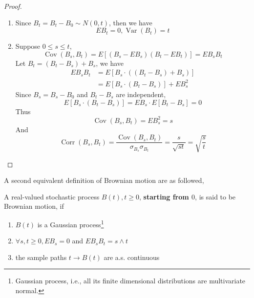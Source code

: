 \begin{proof}
    \begin{enumerate}
        \item Since $B_{t}=B_{t}-B_{0}\sim N(0, t)$, then we have
              \begin{equation*}
                  EB_{t}=0,\operatorname{Var}\left(B_{t}\right)=t
              \end{equation*}
        \item Suppose $0\leq s\leq t$,
              \begin{equation*}
                  \operatorname{Cov}\left(B_{s}, B_{t}\right)=E\left[\left(B_{s}-EB_{s}\right)\left(B_{t}-EB_{t}\right)\right]=EB_{s}B_{t}
              \end{equation*}
              Let $B_{t}=\left(B_{t}-B_{s}\right)+B_{s}$, we have
              \begin{equation*}
                  \begin{aligned}
                      EB_{s}B_{t} & =E\left[B_{s}\cdot\left(\left(B_{t}-B_{s}\right)+B_{s}\right)\right] \\
                                  & =E\left[B_{s}\cdot\left(B_{t}-B_{s}\right)\right]+EB_{s}^{2}
                  \end{aligned}
              \end{equation*}
              Since $B_{s}=B_{s}-B_{0}$ and $B_{t}-B_{s}$ are independent,
              \begin{equation*}
                  E\left[B_{s} \cdot\left(B_{t}-B_{s}\right)\right]=EB_{s} \cdot E\left[B_{t}-B_{s}\right]=0
              \end{equation*}
              Thus
              \begin{equation*}
                  \operatorname{Cov}\left(B_{s}, B_{t}\right)=EB_{s}^{2}=s
              \end{equation*}
              And
              \begin{equation*}
                  \operatorname{Corr}\left(B_{s},B_{t}\right)=\frac{\operatorname{Cov}\left(B_{s},B_{t}\right)}{\sigma_{B_{s}}\sigma_{B_{t}}}=\frac{s}{\sqrt{st}}=\sqrt{\frac{s}{t}}
              \end{equation*}
    \end{enumerate}
\end{proof}

A second equivalent definition of Brownian motion are as followed,

\begin{definition}
    A real-valued stochastic process $B(t),t\geq 0$, \textbf{starting from $0$}, is said to be Brownian motion, if
    \begin{enumerate}
        \item $B(t)$ is a Gaussian process\footnote{Gaussian process, i.e., all its finite dimensional distributions are multivariate normal.}
        \item $\forall s,t\geq 0,EB_{s}=0$ and $EB_{s}B_{t}=s\wedge t$
        \item the sample paths $t\rightarrow B(t)$ are a.s. continuous
    \end{enumerate}
\end{definition}

